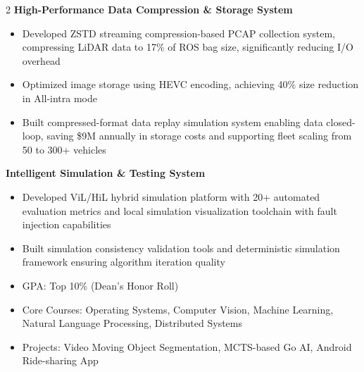 \documentclass[10pt,a4paper,ragged2e,withhyper]{altacv}
\begin{document}
\begin{paracol}{2}
\textbf{High-Performance Data Compression \& Storage System}
\begin{itemize}
\item Developed ZSTD streaming compression-based PCAP collection system, compressing LiDAR data to 17\% of ROS bag size, significantly reducing I/O overhead
\item Optimized image storage using HEVC encoding, achieving 40\% size reduction in All-intra mode
\item Built compressed-format data replay simulation system enabling data closed-loop, saving \$9M annually in storage costs and supporting fleet scaling from 50 to 300+ vehicles
\end{itemize}

\textbf{Intelligent Simulation \& Testing System}
\begin{itemize}
\item Developed ViL/HiL hybrid simulation platform with 20+ automated evaluation metrics and local simulation visualization toolchain with fault injection capabilities
\item Built simulation consistency validation tools and deterministic simulation framework ensuring algorithm iteration quality
\end{itemize}



\switchcolumn


\begin{itemize}
\item GPA: Top 10\% (Dean's Honor Roll)
\item Core Courses: Operating Systems, Computer Vision, Machine Learning, Natural Language Processing, Distributed Systems
\item Projects: Video Moving Object Segmentation, MCTS-based Go AI, Android Ride-sharing App
\end{itemize}





\end{paracol}
\end{document}
